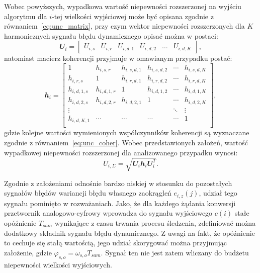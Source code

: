 Wobec powyższych, wypadkowa wartość niepewności rozszerzonej na wyjściu algorytmu dla $i$-tej wielkości wyjściowej może być opisana zgodnie z równaniem~\eqref{eq:unc_matrix}, przy czym wektor niepewności rozszerzonych dla $K$ harmonicznych sygnału błędu dynamicznego opisać można w postaci:
\begin{equation}
\mathbfit{U}_{i} =
\begin{bmatrix}
U_{i,s} & U_{i,r} & U_{i,d,1} & U_{i,d,2} & \hdots & U_{i,d,K}
\end{bmatrix}
\label{eq:pom_uncout_uncvect},
\end{equation}
natomiast macierz koherencji przyjmuje w omawianym przypadku postać:
\begin{equation}
\mathbfit{h}_{i} =
\begin{bmatrix}
1           & h_{i,s,r}   & h_{i,s,d,1} & h_{i,s,d,2} & \cdots & h_{i,s,d,K} \\
h_{i,r,s}   & 1           & h_{i,r,d,1} & h_{i,r,d,2} & \cdots & h_{i,r,d,K} \\
h_{i,d,1,s} & h_{i,d,1,r} & 1           & h_{i,d,1,2} & \cdots & h_{i,d,1,K} \\
h_{i,d,2,s} & h_{i,d,2,r} & h_{i,d,2,1} & 1           & \cdots & h_{i,d,2,K} \\
\vdots      &             &             &             & \ddots & \vdots      \\
h_{i,d,K,1} & \cdots      & \cdots      & \cdots      & \cdots & 1           \\
\end{bmatrix}
\label{eq:pom_uncout_cohers},
\end{equation}
gdzie kolejne wartości wymienionych współczynników koherencji są wyznaczane zgodnie z równaniem~\eqref{eq:unc_coher}. Wobec przedstawionych założeń, wartość wypadkowej niepewności rozszerzonej dla analizowanego przypadku wynosi:
\begin{equation}
U_{i,\Sigma} = \sqrt{\mathbfit{U}_{i} \mathbfit{h}_{i} \mathbfit{U}_{i}^{T}} \label{eq:pom_uncout_sum}.
\end{equation}

Zgodnie z założeniami odnośnie bardzo niskiej w stosunku do pozostałych sygnałów błędów wariancji błędu własnego zaokrągleń $e_{i,z}(j)$, udział tego sygnału pominięto w rozważaniach. Jako, że dla każdego żądania konwersji przetwornik analogowo-cyfrowy wprowadza do sygnału wyjściowego $c(i)$ stałe opóźnienie $T_{sam}$ wynikające z czasu trwania procesu śledzenia, zdefiniować można dodatkowy składnik sygnału błędu dynamicznego. Z uwagi na fakt, że opóźnienie to cechuje się stałą wartością, jego udział skorygować można przyjmując założenie, gdzie $\varphi_{s,o} = \omega_{s,o} T_{sam}$. Sygnał ten nie jest zatem wliczany do budżetu niepewności wielkości wyjściowych.

